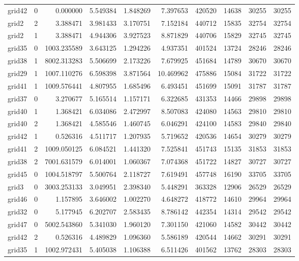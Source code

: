 \begin{longtable}{|l|r|r|r|r|r|r|r|r|r|}
grid42 & 0 & 0.000000 & 5.549384 & 1.848269 & 7.397653 & 420520 & 14638 & 30255 & 30255 \\
grid2 & 2 & 3.388471 & 3.981433 & 3.170751 & 7.152184 & 440712 & 15835 & 32754 & 32754 \\
grid2 & 1 & 3.388471 & 4.944306 & 3.927523 & 8.871829 & 440706 & 15829 & 32745 & 32745 \\
grid35 & 0 & 1003.235589 & 3.643125 & 1.294226 & 4.937351 & 401524 & 13724 & 28246 & 28246 \\
grid38 & 1 & 8002.313283 & 5.506699 & 2.173226 & 7.679925 & 451684 & 14789 & 30670 & 30670 \\
grid29 & 1 & 1007.110276 & 6.598398 & 3.871564 & 10.469962 & 475886 & 15084 & 31722 & 31722 \\
grid41 & 1 & 1009.576441 & 4.807955 & 1.685496 & 6.493451 & 451699 & 15091 & 31787 & 31787 \\
grid37 & 0 & 3.270677 & 5.165514 & 1.157171 & 6.322685 & 431353 & 14466 & 29898 & 29898 \\
grid40 & 1 & 1.368421 & 6.034086 & 2.472997 & 8.507083 & 424080 & 14563 & 29810 & 29810 \\
grid40 & 2 & 1.368421 & 4.585546 & 1.460745 & 6.046291 & 424100 & 14583 & 29840 & 29840 \\
grid42 & 1 & 0.526316 & 4.511717 & 1.207935 & 5.719652 & 420536 & 14654 & 30279 & 30279 \\
grid41 & 2 & 1009.050125 & 6.084521 & 1.441320 & 7.525841 & 451743 & 15135 & 31853 & 31853 \\
grid38 & 2 & 7001.631579 & 6.014001 & 1.060367 & 7.074368 & 451722 & 14827 & 30727 & 30727 \\
grid45 & 0 & 1004.518797 & 5.500764 & 2.118727 & 7.619491 & 457748 & 16190 & 33705 & 33705 \\
grid3 & 0 & 3003.253133 & 3.049951 & 2.398340 & 5.448291 & 363328 & 12906 & 26529 & 26529 \\
grid46 & 0 & 1.157895 & 3.646002 & 1.002270 & 4.648272 & 418772 & 14610 & 29964 & 29964 \\
grid32 & 0 & 5.177945 & 6.202707 & 2.583435 & 8.786142 & 442354 & 14314 & 29542 & 29542 \\
grid47 & 0 & 5002.543860 & 5.341030 & 1.960120 & 7.301150 & 421060 & 14582 & 30442 & 30442 \\
grid42 & 2 & 0.526316 & 4.489829 & 1.096360 & 5.586189 & 420544 & 14662 & 30291 & 30291 \\
grid35 & 1 & 1002.972431 & 5.405038 & 1.106388 & 6.511426 & 401562 & 13762 & 28303 & 28303 \\

\end{longtable}
